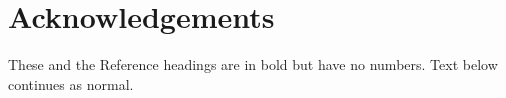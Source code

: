 \documentclass[3p,times,procedia]{elsarticle}
\begin{document}
\section*{Acknowledgements}

These and the Reference headings are in bold but have no numbers. Text below continues as normal.






\end{document}
